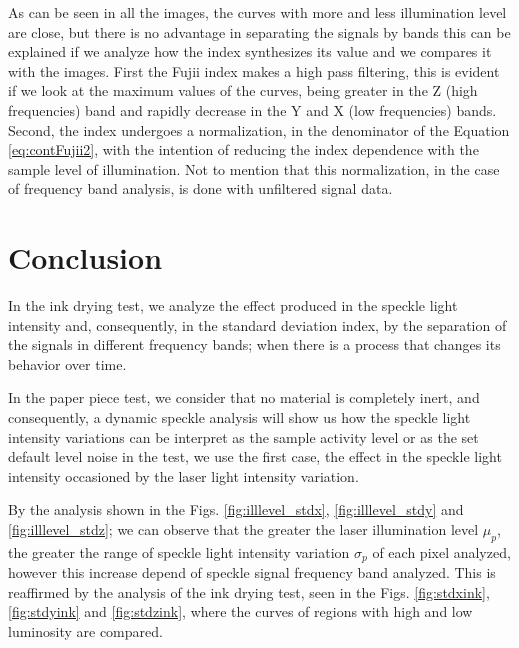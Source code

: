 \documentclass[review]{elsarticle}
\begin{document}
As can be seen in all the images, the curves with more and less  illumination level are close,
but there is no advantage in separating the signals by bands
this can be explained if we analyze how the index synthesizes its value and we compares it with the images.
First the Fujii index makes a high pass filtering,
this is evident if we look at the maximum values of the curves,
being greater in the Z (high frequencies) band and rapidly decrease in the Y and X (low frequencies) bands.
Second, the index undergoes a normalization, in the denominator of the Equation \ref{eq:contFujii2},
with the intention of reducing the index dependence with the sample level of illumination.
Not to mention that this normalization, in the case of frequency band analysis, is done with unfiltered signal data.

\section{Conclusion} 

In the ink drying test, 
we analyze the effect produced in  the speckle light intensity and, consequently, in the standard deviation index, 
by the separation of the signals in different frequency bands;
when there is a process that changes its behavior over time.

In the paper piece test, we consider that no material is completely inert, 
and consequently, 
a dynamic speckle analysis will show us how the speckle light intensity variations can be interpret as the sample activity level or as the set default level noise in the test,
we use the first case,
the effect in the speckle light intensity occasioned by the laser light intensity variation.


By the analysis shown in the Figs. \ref{fig:illlevel_stdx}, \ref{fig:illlevel_stdy} and \ref{fig:illlevel_stdz};
we can observe that the greater the laser illumination level $\mu_p$, 
the greater the range of speckle light intensity variation $\sigma_p$ of each pixel analyzed, 
however this increase depend of speckle signal frequency band analyzed.
This is reaffirmed by the analysis of the ink drying test, 
seen in the Figs. \ref{fig:stdxink}, \ref{fig:stdyink} and \ref{fig:stdzink},
where the curves of regions with high and low luminosity are compared.
\end{document}
